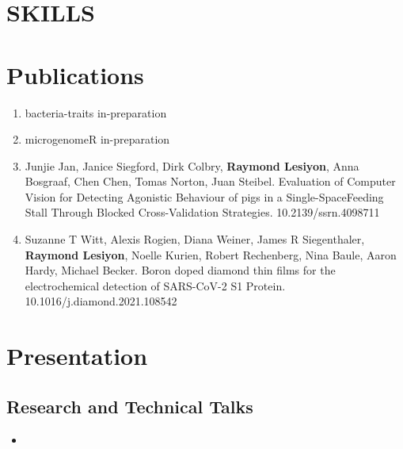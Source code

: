 \documentclass[12pt,a4paper,sans]{moderncv} %
\begin{document}
\section{SKILLS}




\section{Publications}

\begin{enumerate}
    \item bacteria-traits in-preparation
    \item microgenomeR in-preparation
    \item Junjie Jan, Janice Siegford, Dirk Colbry, \textbf{Raymond Lesiyon}, Anna Bosgraaf, Chen Chen, Tomas Norton, Juan Steibel. Evaluation of Computer Vision for Detecting Agonistic Behaviour of pigs in a Single-SpaceFeeding Stall Through Blocked Cross-Validation Strategies. 10.2139/ssrn.4098711
    \item Suzanne T Witt, Alexis Rogien, Diana Weiner, James R Siegenthaler, \textbf{Raymond Lesiyon}, Noelle Kurien, Robert Rechenberg, Nina Baule, Aaron Hardy, Michael Becker. Boron doped diamond thin films for the electrochemical detection of SARS-CoV-2 S1 Protein. 10.1016/j.diamond.2021.108542
\end{enumerate}


\section{Presentation}

\subsection{Research and Technical Talks} 
{
    \begin{itemize}
        \item { }
    \end{itemize}
}
\end{document}
